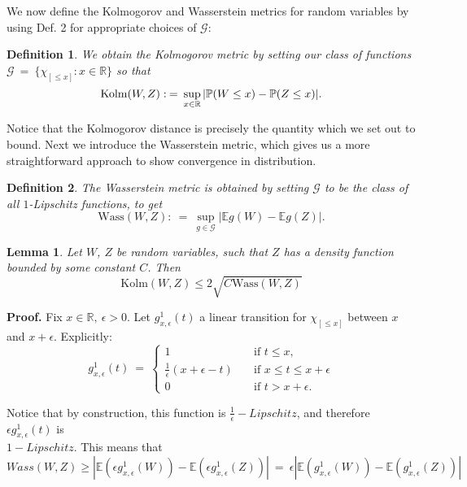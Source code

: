\documentclass[12pt]{article}
\newcommand{\eq }{\: = \:}
\newtheorem{lemma}{Lemma}
\newtheorem{definition}{Definition}
\theoremstyle{nonumberplain}
\begin{document}
We now define the Kolmogorov and Wasserstein metrics for random variables by using Def. 2 for appropriate choices of $\mathcal{G}$:
\begin{definition}
  We obtain the \textit{Kolmogorov} metric by setting our class of functions 
  $\mathcal{G} \eq  \{ \chi_{[\le x]}: x \in \mathbb{R} \}$ so that
  $$
  \mathrm{Kolm}(W,Z):\eq \sup \limits_{x\in \mathbb{R}}\\ |\mathbb{P}(W\leq x)-\mathbb{P}(Z\leq x)|.
  $$
\end{definition}

Notice that the Kolmogorov distance is precisely the quantity which we set out to bound. Next we introduce the Wasserstein metric, which gives us a more straightforward approach to show convergence in distribution.

\begin{definition}
  The \textit{Wasserstein} metric is obtained by setting $\mathcal{G}$ to be the class of all $1$-Lipschitz functions, to get
  $$
  \mathrm{Wass}(W,Z):\eq \sup \limits_{g\in \mathcal{G}} |\mathbb{E}g(W)-\mathbb{E}g(Z)|.
  $$

\end{definition}

\begin{lemma}
Let $W$, $Z$ be random variables, such that $Z$ has a density function bounded by some constant $C$. Then 
$$
\mathrm{Kolm}(W,Z)\leq  2\sqrt{C\mathrm{Wass}(W,Z)}
$$
\end{lemma}
\textbf{Proof.} Fix $x \in \mathbb{R}, \: \epsilon>0$. Let $g_{x,\epsilon}^{1}(t)$ a linear transition for $\chi_{[\le x]}$ between $x$ and $x + \epsilon$. Explicitly:
$$
g_{x,\epsilon}^{1}(t)\eq \left\{
            \begin{array}{ll}
             1 \quad &\mbox{if } t\le x,\\
             \frac{1}{\epsilon} (x  + \epsilon - t) \quad &\mbox{if } x \le t \le x + \epsilon \\
             0 \quad &\mbox{if } t > x + \epsilon.  
            \end{array}
            \right.
$$

Notice that by construction, this function is $\frac{1}{\epsilon}-Lipschitz$, and therefore $\epsilon g_{x,\epsilon}^{1}(t)$ is \\
$1-Lipschitz$. This means that 
$$
Wass(W, Z) \ge \left| \mathbb{E}(\epsilon g_{x, \epsilon}^{1}(W))-
                        \mathbb{E}(\epsilon g_{x, \epsilon}^{1}(Z)) \right| \eq 
        \epsilon \left| \mathbb{E}(g_{x, \epsilon} ^ {1}(W))-
                        \mathbb{E}(g_{x, \epsilon} ^ {1}(Z)) \right|
$$
\end{document}
